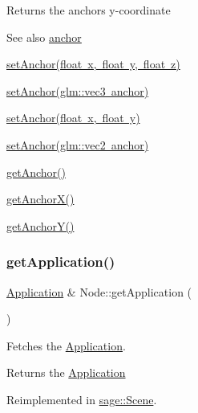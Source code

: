 \begin{DoxyReturn}{Returns}
the anchor\textquotesingle{}s y-\/coordinate 
\end{DoxyReturn}
\begin{DoxySeeAlso}{See also}
\mbox{\hyperlink{classsage_1_1Node_a8698d732514fa2caba0ccee46dbae17a}{anchor}} 

\mbox{\hyperlink{classsage_1_1Node_a04d15cec594320725e6ef44756346d2a}{set\+Anchor(float x, float y, float z)}} 

\mbox{\hyperlink{classsage_1_1Node_a96a786cd6d6750d60c8195aa4895de7c}{set\+Anchor(glm\+::vec3 anchor)}} 

\mbox{\hyperlink{classsage_1_1Node_a8813a645a74f6ab59b25d434e65035c6}{set\+Anchor(float x, float y)}} 

\mbox{\hyperlink{classsage_1_1Node_a957a7e578660950b8518926239397ea0}{set\+Anchor(glm\+::vec2 anchor)}} 

\mbox{\hyperlink{classsage_1_1Node_a1314e39981d8adee8a75c96f29c9e181}{get\+Anchor()}} 

\mbox{\hyperlink{classsage_1_1Node_aa5f31c33d60b32b618d3beaf4e5c6c51}{get\+Anchor\+X()}} 

\mbox{\hyperlink{classsage_1_1Node_a78c5f86d0081854603178fb52d8c0a9b}{get\+Anchor\+Y()}} 
\end{DoxySeeAlso}
\mbox{\label{classsage_1_1Node_a94ddcfcf924b47e46cda2665328f6595}} 
\subsubsection{\texorpdfstring{getApplication()}{getApplication()}}
{\footnotesize\ttfamily \mbox{\hyperlink{classsage_1_1Application}{Application}} \& Node\+::get\+Application (\begin{DoxyParamCaption}{ }\end{DoxyParamCaption})\hspace{0.3cm}{\ttfamily [virtual]}}



Fetches the \mbox{\hyperlink{classsage_1_1Application}{Application}}. 

\begin{DoxyReturn}{Returns}
the \mbox{\hyperlink{classsage_1_1Application}{Application}} 
\end{DoxyReturn}


Reimplemented in \mbox{\hyperlink{classsage_1_1Scene_ae81f9c71c6a8e6e57b1759018a3e0a3c}{sage\+::\+Scene}}.

